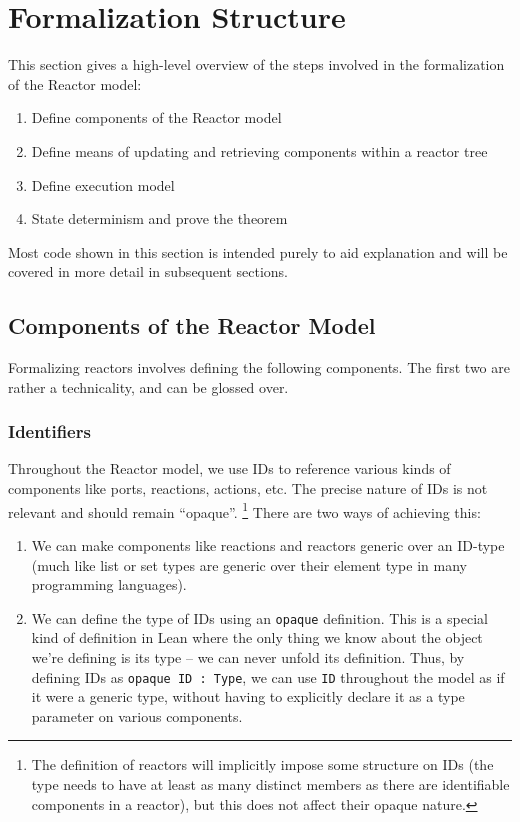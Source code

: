 \section{Formalization Structure}

This section gives a high-level overview of the steps involved in the formalization of the Reactor model:

\begin{enumerate}
    \item Define components of the Reactor model
    \item Define means of updating and retrieving components within a reactor tree
    \item Define execution model
    \item State determinism and prove the theorem
\end{enumerate}

Most code shown in this section is intended purely to aid explanation and will be covered in more detail in subsequent sections.

\subsection{Components of the Reactor Model}

Formalizing reactors involves defining the following components.
The first two are rather a technicality, and can be glossed over.

\subsubsection{Identifiers}

Throughout the Reactor model, we use IDs to reference various kinds of components like ports, reactions, actions, etc.
The precise nature of IDs is not relevant and should remain ``opaque''. \footnote{The definition of reactors will implicitly impose some structure on IDs (the type needs to have at least as many distinct members as there are identifiable components in a reactor), but this does not affect their opaque nature.}
There are two ways of achieving this:

\begin{enumerate}
    \item We can make components like reactions and reactors generic over an ID-type (much like list or set types are generic over their element type in many programming languages).
    \item We can define the type of IDs using an \lstinline{opaque} definition. 
        This is a special kind of definition in Lean where the only thing we know about the object we're defining is its type -- we can never unfold its definition.
        Thus, by defining IDs as \lstinline{opaque ID : Type}, we can use \lstinline{ID} throughout the model as if it were a generic type, without having to explicitly declare it as a type parameter on various components.
\end{enumerate}

